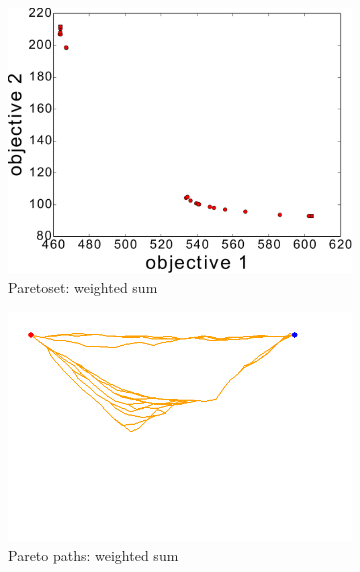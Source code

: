 \documentclass{article}
\begin{document}
\begin{figure}
\begin{subfigure}[b]{0.45\linewidth}
		\includegraphics[width=\textwidth]{fig/sim4-obstacle/PF04-MORRT.pdf}
		\caption{Paretoset: weighted sum}
		\label{fig:sim:obs:pf:a}
	\end{subfigure}
	\begin{subfigure}[b]{0.45\linewidth}
		\centering
		\includegraphics[width=\textwidth]{fig/sim4-obstacle/MORRTstar01-1-ALL.png}
		\caption{Pareto paths: weighted sum}
		\label{fig:sim:obs:sols:a}
	\end{subfigure}  \\
	\begin{subfigure}[b]{0.45\linewidth}
		\centering

\end{subfigure}
\end{figure}
\end{document}

